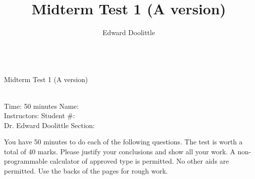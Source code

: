 \documentclass[12pt]{article}
\title{Midterm Test 1 (A version)}
\author{Edward Doolittle}
\begin{document}
\thispagestyle{plain}

\begin{center}
  \quad\\
  \LARGE{Midterm Test 1 (A version)}
\end{center}

\begin{flushleft}
\quad\\
Time: 50 minutes                \hfill       Name: \underline{\hspace{2in}}  \\
Instructors:                    \hfill Student \#: \underline{\hspace{2in}}  \\
\quad Dr. Edward Doolittle      \hfill    Section: \underline{\hspace{2in}}  \\
\end{flushleft}


\noindent
You have 50 minutes to do each of the following questions.
The test is worth a total of 40 marks.
Please justify your conclusions and
show all your work.
A non-programmable calculator of approved type is permitted.  No other aids
are permitted.
Use the backs of the pages for rough work.
\end{document}

